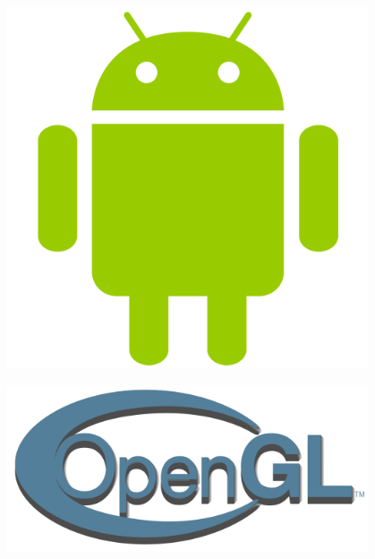 \documentclass{beamer} %
\begin{document}
\begin{frame}{\subsecname}
\begin{columns}
\begin{column}{0.58\textwidth}
    \end{column}
    \begin{column}{0.38\textwidth}
      \begin{figure}
        \includegraphics[height=0.25\textheight, keepaspectratio]{android.png}
      \end{figure}
      \begin{figure}
        \includegraphics[width=\linewidth, height=\textheight, keepaspectratio]{opengl.png}
      \end{figure}
    \end{column}
  \end{columns}
    
  \end{frame}
\end{document}
